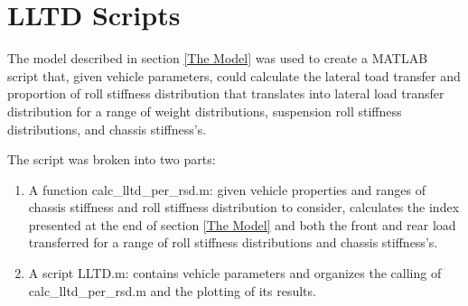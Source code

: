 \section{LLTD Scripts} \label{LLTD Scripts}
The model described in section \ref{The Model} was used to create a MATLAB script that, given vehicle parameters, could calculate the lateral toad transfer and proportion of roll stiffness distribution that translates into lateral load transfer distribution for a range of weight distributions, suspension roll stiffness distributions, and chassis stiffness’s.

The script was broken into two parts:
\begin{enumerate}
	\item A function calc\_lltd\_per\_rsd.m: given vehicle properties and ranges of chassis stiffness and roll stiffness distribution to consider, calculates the index presented at the end of section \ref{The Model} and both the front and rear load transferred for a range of roll stiffness distributions and chassis stiffness’s.
	\item A script LLTD.m: contains vehicle parameters and organizes the calling of calc\_lltd\_per\_rsd.m and the plotting of its results.
\end{enumerate}
